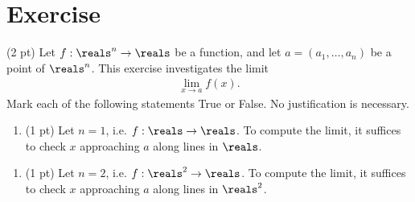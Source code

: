 \section{Exercise}

(2 pt) Let $f: \reals^{n} \rightarrow \reals$ be a function, and let $a = (a_{1},\ldots,a_{n})$ be a point of $\reals^{n}$. This exercise investigates the limit
\begin{align*}
\lim_{x \rightarrow a} f(x).
\end{align*}
Mark each of the following statements True or False. No justification is necessary.
\begin{enumerate}[label=(\alph*)]
\item (1 pt) Let $n = 1$, i.e. $f: \reals \rightarrow \reals$. To compute the limit, it suffices to check $x$ approaching $a$ along lines in $\reals$.
\end{enumerate}

\spaceSolution{.25in}{}

\begin{enumerate}[resume,label=(\alph*)]
\item (1 pt) Let $n = 2$, i.e. $f: \reals^{2} \rightarrow \reals$. To compute the limit, it suffices to check $x$ approaching $a$ along lines in $\reals^{2}$.
\end{enumerate}
